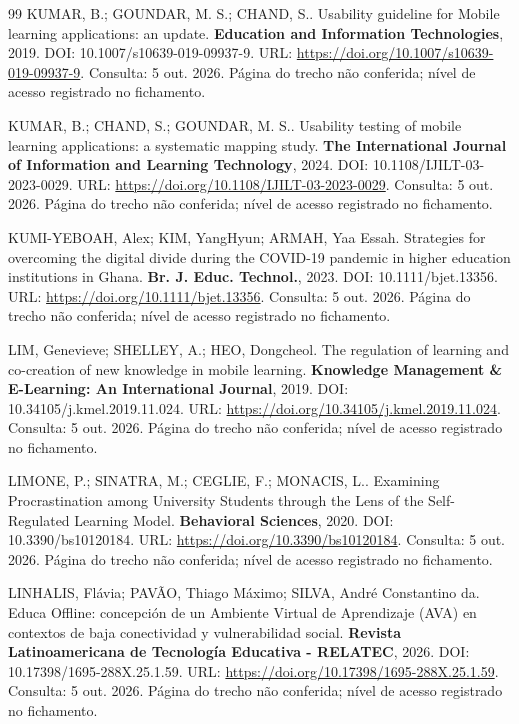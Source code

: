 \begin{thebibliography}{99}
 KUMAR, B.; GOUNDAR, M. S.; CHAND, S.. Usability guideline for Mobile learning applications: an update. \textbf{Education and Information Technologies}, 2019. DOI: 10.1007/s10639-019-09937-9. URL: \url{https://doi.org/10.1007/s10639-019-09937-9}. Consulta: 5 out. 2026. Página do trecho não conferida; nível de acesso registrado no fichamento.


 KUMAR, B.; CHAND, S.; GOUNDAR, M. S.. Usability testing of mobile learning applications: a systematic mapping study. \textbf{The International Journal of Information and Learning Technology}, 2024. DOI: 10.1108/IJILT-03-2023-0029. URL: \url{https://doi.org/10.1108/IJILT-03-2023-0029}. Consulta: 5 out. 2026. Página do trecho não conferida; nível de acesso registrado no fichamento.


 KUMI-YEBOAH, Alex; KIM, YangHyun; ARMAH, Yaa Essah. Strategies for overcoming the digital divide during the COVID-19 pandemic in higher education institutions in Ghana. \textbf{Br. J. Educ. Technol.}, 2023. DOI: 10.1111/bjet.13356. URL: \url{https://doi.org/10.1111/bjet.13356}. Consulta: 5 out. 2026. Página do trecho não conferida; nível de acesso registrado no fichamento.


 LIM, Genevieve; SHELLEY, A.; HEO, Dongcheol. The regulation of learning and co-creation of new knowledge in mobile learning. \textbf{Knowledge Management \& E-Learning: An International Journal}, 2019. DOI: 10.34105/j.kmel.2019.11.024. URL: \url{https://doi.org/10.34105/j.kmel.2019.11.024}. Consulta: 5 out. 2026. Página do trecho não conferida; nível de acesso registrado no fichamento.


 LIMONE, P.; SINATRA, M.; CEGLIE, F.; MONACIS, L.. Examining Procrastination among University Students through the Lens of the Self-Regulated Learning Model. \textbf{Behavioral Sciences}, 2020. DOI: 10.3390/bs10120184. URL: \url{https://doi.org/10.3390/bs10120184}. Consulta: 5 out. 2026. Página do trecho não conferida; nível de acesso registrado no fichamento.


 LINHALIS, Flávia; PAVÃO, Thiago Máximo; SILVA, André Constantino da. Educa Offline: concepción de un Ambiente Virtual de Aprendizaje (AVA) en contextos de baja conectividad y vulnerabilidad social. \textbf{Revista Latinoamericana de Tecnología Educativa - RELATEC}, 2026. DOI: 10.17398/1695-288X.25.1.59. URL: \url{https://doi.org/10.17398/1695-288X.25.1.59}. Consulta: 5 out. 2026. Página do trecho não conferida; nível de acesso registrado no fichamento.



\end{thebibliography}
